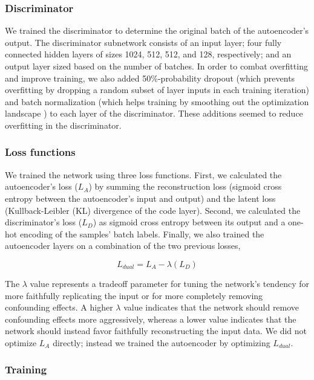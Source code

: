\documentclass[11pt]{article}
\begin{document}
\subsubsection{Discriminator}

We trained the discriminator to determine the original batch of the autoencoder's output.
The discriminator subnetwork consists of an input layer; four fully connected hidden layers of sizes 1024, 512, 512, and 128, respectively; and an output layer sized based on the number of batches.
In order to combat overfitting and improve training, we also added 50\%-probability dropout \cite{srivastava_dropout_2014} (which prevents overfitting by dropping a random subset of layer inputs in each training iteration) and batch normalization \cite{ioffe_batch_2015} (which helps training by smoothing out the optimization landscape \citep{santurkar_how_2018}) to each layer of the discriminator.
These additions seemed to reduce overfitting in the discriminator.

\subsubsection{Loss functions}

We trained the network using three loss functions.
First, we calculated the autoencoder's loss ($L_A$) by summing the reconstruction loss (sigmoid cross entropy between the autoencoder's input and output) and the latent loss (Kullback-Leibler (KL) divergence \cite{kullback_information_1951} of the code layer).
Second, we calculated the discriminator's loss ($L_D$) as sigmoid cross entropy between its output and a one-hot encoding of the samples' batch labels.
Finally, we also trained the autoencoder layers on a combination of the two previous losses,

\begin{equation}
	\label{dual_loss}
	L_{dual} = L_A - \lambda{}(L_D)
\end{equation}

The $\lambda$ value represents a tradeoff parameter for tuning the network's tendency for more faithfully replicating the input or for more completely removing confounding effects.
A higher $\lambda$ value indicates that the network should remove confounding effects more aggressively, whereas a lower value indicates that the network should instead favor faithfully reconstructing the input data.
We did not optimize $L_A$ directly; instead we trained the autoencoder by optimizing $L_{dual}$.

\subsubsection{Training}
\end{document}
